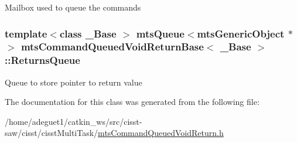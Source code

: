 Mailbox used to queue the commands \hypertarget{classmts_command_queued_void_return_base_a9926c9d6613de0a461be38fcb5739be5}{
\subsubsection[{Returns\-Queue}]{\setlength{\rightskip}{0pt plus 5cm}template$<$class \-\_\-\-Base $>$ {\bf mts\-Queue}$<${\bf mts\-Generic\-Object} $\ast$$>$ {\bf mts\-Command\-Queued\-Void\-Return\-Base}$<$ \-\_\-\-Base $>$\-::Returns\-Queue\hspace{0.3cm}{\ttfamily [protected]}}}\label{classmts_command_queued_void_return_base_a9926c9d6613de0a461be38fcb5739be5}
Queue to store pointer to return value 

The documentation for this class was generated from the following file\-:\begin{DoxyCompactItemize}
\item 
/home/adeguet1/catkin\-\_\-ws/src/cisst-\/saw/cisst/cisst\-Multi\-Task/\hyperlink{mts_command_queued_void_return_8h}{mts\-Command\-Queued\-Void\-Return.\-h}\end{DoxyCompactItemize}
